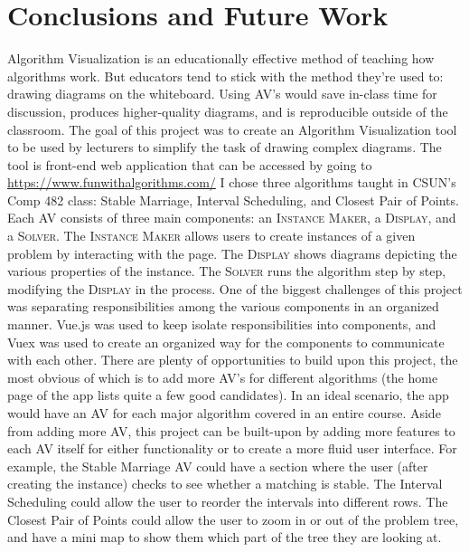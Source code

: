 \chapter{Conclusions and Future Work}
Algorithm Visualization is an educationally effective method of teaching
how algorithms work. But educators tend to stick with the method they're used to: 
drawing diagrams on the whiteboard. 
Using AV's would save in-class time for discussion,  
produces higher-quality diagrams,
and is reproducible outside of the classroom.
\newline\newline
The goal of this project was to create an Algorithm Visualization tool to be used 
by lecturers to simplify the task of drawing complex diagrams. 
The tool is front-end web application that can be accessed by going to 
\underline{https://www.funwithalgorithms.com/}
\newline\newline
I chose three algorithms taught in CSUN's Comp 482 class:
Stable Marriage, 
Interval Scheduling, 
and Closest Pair of Points.
Each AV consists of three main components:
an \textsc{Instance Maker}, 
a \textsc{Display},
and a \textsc{Solver}. 
The \textsc{Instance Maker} allows users to 
create instances of a given problem by interacting with the page. 
The \textsc{Display} shows diagrams depicting the various 
properties of the instance. 
The \textsc{Solver} runs the algorithm step by step, 
modifying the \textsc{Display} in the process. 
\newline\newline
One of the biggest challenges of this project was 
separating responsibilities among the various components 
in an organized manner. 
Vue.js was used to keep isolate responsibilities into components, 
and Vuex was used to create an organized way for the components 
to communicate with each other. 
\newline\newline
There are plenty of opportunities to build upon this project, 
the most obvious of which is to add more AV's for different algorithms 
(the home page of the app lists quite a few good candidates). 
In an ideal scenario, the app would have an AV for each major 
algorithm covered in an entire course. 
\newline\newline
Aside from adding more AV, this project can be built-upon 
by adding more features to each AV itself for either functionality or 
to create a more fluid user interface. 
For example, the Stable Marriage AV could have a section where
the user (after creating the instance) checks to see whether a 
matching is stable. 
The Interval Scheduling could allow the user to reorder the 
intervals into different rows.
The Closest Pair of Points could allow the user to zoom in or 
out of the problem tree, and have a mini map to show them 
which part of the tree they are looking at. 
